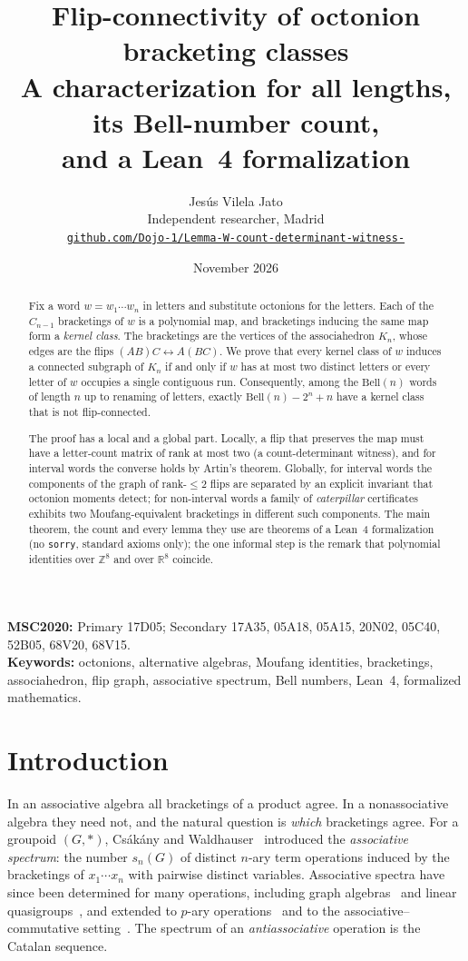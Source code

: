 \documentclass[11pt,a4paper]{article}
\title{\vspace{-1.2em}\textbf{Flip-connectivity of octonion bracketing classes}\\[0.35em]
\large A characterization for all lengths, its Bell-number count,\\ and a Lean~4 formalization}
\author{Jes\'us Vilela Jato\\[0.2em]
\small Independent researcher, Madrid\\
\small \href{https://github.com/Dojo-1/Lemma-W-count-determinant-witness-}{\texttt{github.com/Dojo-1/Lemma-W-count-determinant-witness-}}}
\date{November 2026}
\theoremstyle{definition}
\theoremstyle{remark}
\newcommand{\ZZ}{\mathbb{Z}}
\newcommand{\RR}{\mathbb{R}}
\newcommand{\Bell}{\mathrm{Bell}}
\begin{document}
\maketitle

\begin{abstract}
\noindent
Fix a word $w=w_1\cdots w_n$ in letters and substitute octonions for the letters. Each of the
$C_{n-1}$ bracketings of $w$ is a polynomial map, and bracketings inducing the same map form a
\emph{kernel class}. The bracketings are the vertices of the associahedron $K_n$, whose edges are the
flips $(AB)C\leftrightarrow A(BC)$. We prove that every kernel class of $w$ induces a connected
subgraph of $K_n$ if and only if $w$ has at most two distinct letters or every letter of $w$ occupies a
single contiguous run. Consequently, among the $\Bell(n)$ words of length $n$ up to renaming of letters,
exactly $\Bell(n)-2^n+n$ have a kernel class that is not flip-connected.

The proof has a local and a global part. Locally, a flip that preserves the map must have a
letter-count matrix of rank at most two (a count-determinant witness), and for interval words the
converse holds by Artin's theorem. Globally, for interval words the components of the graph of
rank-$\le2$ flips are separated by an explicit invariant that octonion moments detect; for non-interval
words a family of \emph{caterpillar} certificates exhibits two Moufang-equivalent bracketings in
different such components. The main theorem, the count and every lemma they use are theorems of a
Lean~4 formalization (no \texttt{sorry}, standard axioms only); the one informal step is the remark that
polynomial identities over $\ZZ^8$ and over $\RR^8$ coincide.
\end{abstract}

\noindent\textbf{MSC2020:} Primary 17D05; Secondary 17A35, 05A18, 05A15, 20N02, 05C40, 52B05, 68V20, 68V15.\\[0.2em]
\textbf{Keywords:} octonions, alternative algebras, Moufang identities, bracketings, associahedron,
flip graph, associative spectrum, Bell numbers, Lean~4, formalized mathematics.

\tableofcontents

\section{Introduction}\label{sec:intro}

In an associative algebra all bracketings of a product agree. In a nonassociative algebra they need not,
and the natural question is \emph{which} bracketings agree. For a groupoid $(G,\ast)$, Cs\'ak\'any and
Waldhauser~\cite{CW00} introduced the \emph{associative spectrum}: the number $s_n(G)$ of distinct
$n$-ary term operations induced by the bracketings of $x_1\cdots x_n$ with pairwise distinct
variables. Associative spectra have since been determined for many operations, including graph
algebras~\cite{LW22} and linear quasigroups~\cite{LW23}, and extended to $p$-ary operations~\cite{LiW09}
and to the associative--commutative setting~\cite{HL22}. The spectrum of an \emph{antiassociative}
operation is the Catalan sequence.
\end{document}
